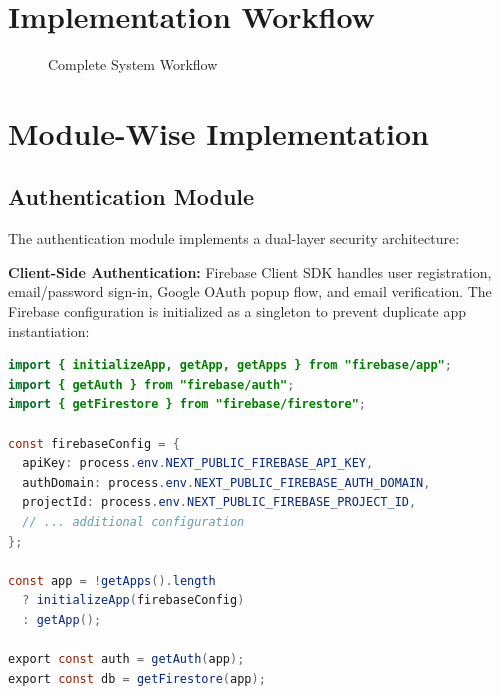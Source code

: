 \documentclass[12pt,a4paper,oneside]{report}
\begin{document}
\section{Implementation Workflow}

\begin{figure}[H]
\centering
{}
\caption{Complete System Workflow}
\label{fig:workflow}
\end{figure}


\section{Module-Wise Implementation}

\subsection{Authentication Module}

The authentication module implements a dual-layer security architecture:

\textbf{Client-Side Authentication:} Firebase Client SDK handles user registration, email/password sign-in, Google OAuth popup flow, and email verification. The Firebase configuration is initialized as a singleton to prevent duplicate app instantiation:

\begin{lstlisting}[language=Java, caption={Firebase Client SDK Initialization}, label={lst:firebase_client}]
import { initializeApp, getApp, getApps } from "firebase/app";
import { getAuth } from "firebase/auth";
import { getFirestore } from "firebase/firestore";

const firebaseConfig = {
  apiKey: process.env.NEXT_PUBLIC_FIREBASE_API_KEY,
  authDomain: process.env.NEXT_PUBLIC_FIREBASE_AUTH_DOMAIN,
  projectId: process.env.NEXT_PUBLIC_FIREBASE_PROJECT_ID,
  // ... additional configuration
};

const app = !getApps().length
  ? initializeApp(firebaseConfig)
  : getApp();

export const auth = getAuth(app);
export const db = getFirestore(app);
\end{lstlisting}
\end{document}
